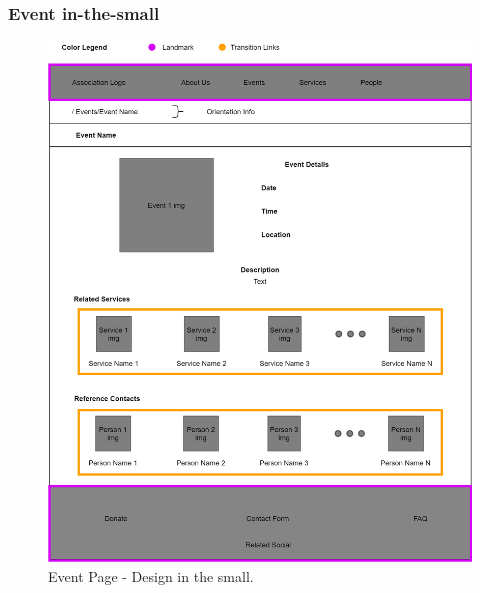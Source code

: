 \clearpage

\subsubsection{Event in-the-small}
\begin{figure}[h!]
		\centering
		\begin{minipage}[b]{1\textwidth}
    			\includegraphics[width=\textwidth]{./assets/eventdetails.png}
			\caption{Event Page - Design in the small.}
		\end{minipage}
\end{figure}
\FloatBarrier

\clearpage

